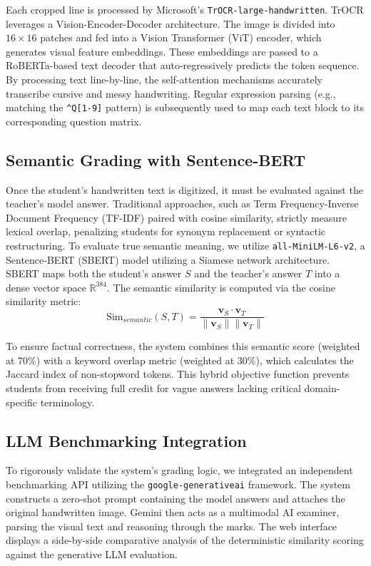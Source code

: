 \documentclass[conference]{IEEEtran}
\begin{document}
Each cropped line is processed by Microsoft's \texttt{TrOCR-large-handwritten}. TrOCR leverages a Vision-Encoder-Decoder architecture. The image is divided into $16 \times 16$ patches and fed into a Vision Transformer (ViT) encoder, which generates visual feature embeddings. These embeddings are passed to a RoBERTa-based text decoder that auto-regressively predicts the token sequence. By processing text line-by-line, the self-attention mechanisms accurately transcribe cursive and messy handwriting. Regular expression parsing (e.g., matching the \texttt{\textasciicircum Q[1-9]} pattern) is subsequently used to map each text block to its corresponding question matrix.

\subsection{Semantic Grading with Sentence-BERT}
Once the student's handwritten text is digitized, it must be evaluated against the teacher's model answer. Traditional approaches, such as Term Frequency-Inverse Document Frequency (TF-IDF) paired with cosine similarity, strictly measure lexical overlap, penalizing students for synonym replacement or syntactic restructuring. To evaluate true semantic meaning, we utilize \texttt{all-MiniLM-L6-v2}, a Sentence-BERT (SBERT) model utilizing a Siamese network architecture. SBERT maps both the student's answer $S$ and the teacher's answer $T$ into a dense vector space $\mathbb{R}^{384}$. The semantic similarity is computed via the cosine similarity metric:
\begin{equation}
    \text{Sim}_{semantic}(S, T) = \frac{\mathbf{v}_S \cdot \mathbf{v}_T}{\|\mathbf{v}_S\| \|\mathbf{v}_T\|}
\end{equation}

To ensure factual correctness, the system combines this semantic score (weighted at 70\%) with a keyword overlap metric (weighted at 30\%), which calculates the Jaccard index of non-stopword tokens. This hybrid objective function prevents students from receiving full credit for vague answers lacking critical domain-specific terminology.

\subsection{LLM Benchmarking Integration}
To rigorously validate the system's grading logic, we integrated an independent benchmarking API utilizing the \texttt{google-generativeai} framework. The system constructs a zero-shot prompt containing the model answers and attaches the original handwritten image. Gemini then acts as a multimodal AI examiner, parsing the visual text and reasoning through the marks. The web interface displays a side-by-side comparative analysis of the deterministic similarity scoring against the generative LLM evaluation.
\end{document}
